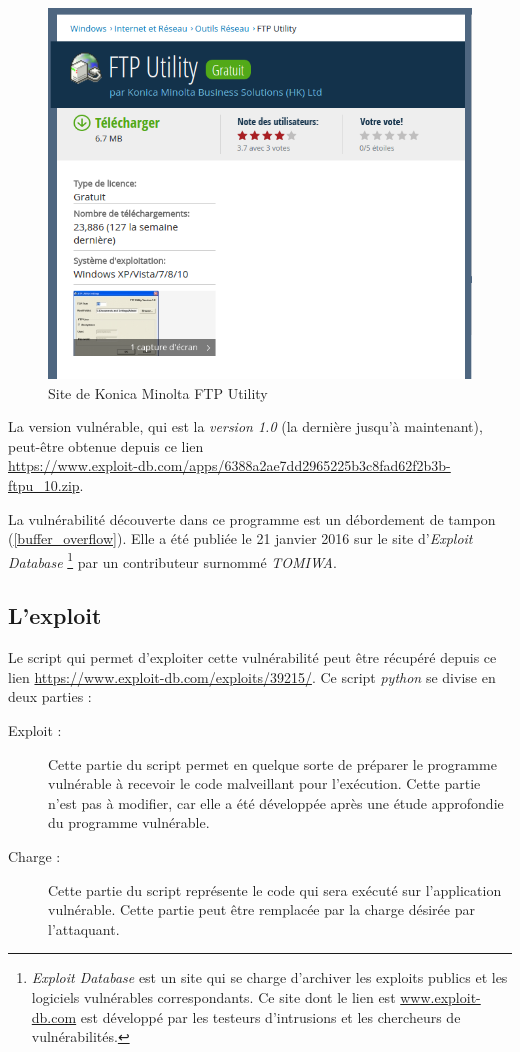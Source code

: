     \begin{figure}[h]
        \centering
        \includegraphics[width=0.8\linewidth]{images/konica_minolta_site.png}
        \caption{Site de Konica Minolta FTP Utility}
        \label{konica_minolta_site}
    \end{figure}

    La version vulnérable, qui est la \emph{version 1.0} 
    (la dernière jusqu'à maintenant), peut-être obtenue depuis ce lien \\\url{https://www.exploit-db.com/apps/6388a2ae7dd2965225b3c8fad62f2b3b-ftpu_10.zip}. %
     
    La vulnérabilité découverte dans ce programme est un débordement de tampon (\autoref{buffer_overflow}). 
    Elle a été publiée le 21 janvier 2016 sur le site d'\emph{Exploit Database} 
    \footnote{\emph{Exploit Database} est un site qui se charge d'archiver les exploits publics et les 
    logiciels vulnérables correspondants. Ce site dont le lien est \url{www.exploit-db.com} est développé 
    par les testeurs d'intrusions et les chercheurs de vulnérabilités.} par un contributeur surnommé \emph{TOMIWA}.

    \subsection{L'exploit}
    Le script qui permet d'exploiter cette vulnérabilité peut être récupéré depuis ce lien 
    \url{https://www.exploit-db.com/exploits/39215/}. Ce script \emph{python} \cite{python} se divise en deux parties :
    \begin{description}
        \item[Exploit :] Cette partie du script permet en quelque sorte de préparer le programme vulnérable à 
            recevoir le code malveillant pour l'exécution. Cette partie n'est pas à modifier, car elle a été développée
            après une étude approfondie du programme vulnérable.

        \item[Charge :] Cette partie du script représente le code qui sera exécuté sur l'application vulnérable. 
            Cette partie peut être remplacée par la charge désirée par l'attaquant.
    \end{description}

